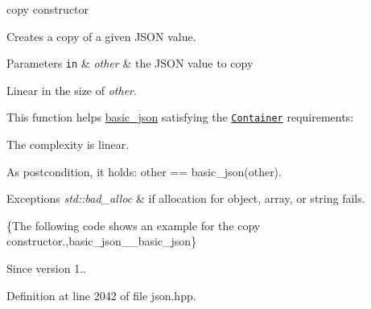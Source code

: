 copy constructor 

Creates a copy of a given J\+S\+O\+N value.


\begin{DoxyParams}[1]{Parameters}
\mbox{\tt in}  & {\em other} & the J\+S\+O\+N value to copy\\
\hline
\end{DoxyParams}
Linear in the size of {\itshape other}.

This function helps {\ttfamily \hyperlink{classnlohmann_1_1basic__json}{basic\+\_\+json}} satisfying the \href{http://en.cppreference.com/w/cpp/concept/Container}{\tt Container} requirements\+:
\begin{DoxyItemize}
\item The complexity is linear.
\item As postcondition, it holds\+: {\ttfamily other == basic\+\_\+json(other)}.
\end{DoxyItemize}


\begin{DoxyExceptions}{Exceptions}
{\em std\+::bad\+\_\+alloc} & if allocation for object, array, or string fails.\\
\hline
\end{DoxyExceptions}
\{The following code shows an example for the copy constructor.,basic\+\_\+json\+\_\+\+\_\+basic\+\_\+json\}

\begin{DoxySince}{Since}
version 1.. 
\end{DoxySince}


Definition at line 2042 of file json.\+hpp.

\hypertarget{classnlohmann_1_1basic__json_a73e150cbcba5643cb89de8f515eb64e2}{}
